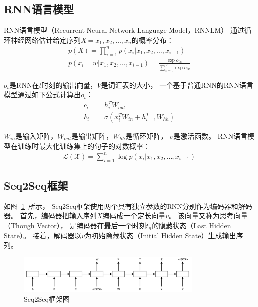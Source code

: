 \subsection{RNN语言模型}\label{subsec:RNNLM}
RNN语言模型（Recurrent Neural Network Language Model，RNNLM）
通过循环神经网络估计给定序列$X = x_1, x_2, \dots, x_n$的概率分布：
\begin{align}
    p(X) = \prod_{i=1}^{n} p(x_i|x_1, x_2, \dots, x_{i-1})
    \label{eqn:language_model_probability} \\
    p(x_i = w|x_1, x_2, \dots, x_{i-1}) = \frac{\exp{o_{tw}}}{\sum_{v=1}^V \exp{o_{tv}}}
    \label{eqn:language_model_estimation}
\end{align}

$o_t$是RNN在$t$时刻的输出向量，$V$是词汇表的大小，
一个基于普通RNN的RNN语言模型通过如下公式计算出$o_t$：
\begin{align}
    o_i &= h_i^T W_{out} \\
    h_i &= \sigma \left( x_i^T W_{in} + h_{i-1}^T W_{hh} \right)
\end{align}

$W_{in}$是输入矩阵，$W_{out}$是输出矩阵，$W_{hh}$是循环矩阵，
$\sigma$是激活函数。
RNN语言模型在训练时最大化训练集上的句子的对数概率：
\begin{align}
    \mathcal{L(X)} = \sum_{i=1}^n \log p(x_i|x_1, x_2, \dots, x_{i-1})
\end{align}

\subsection{Seq2Seq框架}\label{subsec:Seq2Seq}
如图~\ref{fig:Seq2Seq}~所示，
Seq2Seq框架使用两个具有独立参数的RNN分别作为编码器和解码器。
首先，编码器把输入序列$X$编码成一个定长向量$v$。
该向量又称为思考向量（Though Vector），
是编码器在最后一个时刻$t_{n}$的隐藏状态（Last Hidden State）。
接着，解码器以$v$为初始隐藏状态（Initial Hidden State）生成输出序列。
\begin{figure}[H]
    \centering
    \includegraphics[width=0.8\textwidth]{figure/Seq2Seq.png}
    \caption{Seq2Seq框架图}
    \label{fig:Seq2Seq}
\end{figure}

